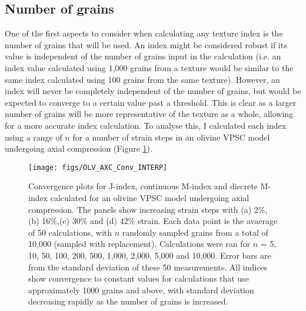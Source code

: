 \documentclass[a4paper,12pt]{report}
\numberwithin{equation}{chapter}
\begin{document}
\subsection{Number of grains}

One of the first aspects to consider when calculating any texture index is the number of grains that will be used. An index might be considered robust if its value is independent of the number of grains input in the calculation (i.e. an index value calculated using 1,000 grains from a texture would be similar to the same index calculated using 100 grains from the same texture). However, an index will never be completely independent of the number of grains, but would be expected to converge to a certain value past a threshold. This is clear as a larger number of grains will be more representative of the texture as a whole, allowing for a more accurate index calculation. To analyse this, I calculated each index using a range of $n$ for a number of strain steps in an olivine VPSC model undergoing axial compression (Figure \ref{fig:OLV_AXC_n_conv}). 

\begin{figure}[bht]
  \centering
    \texttt{[image: figs/OLV\_AXC\_Conv\_INTERP]}
  \caption[Convergence with no. grains (olivine VPSC)]{Convergence plots for J-index, continuous M-index and discrete M-index calculated for an olivine VPSC model undergoing axial compression. The panels show increasing strain steps with (a) 2\%, (b) 16\%,(c) 30\% and (d) 42\% strain. Each data point is the avaerage of 50 calculations, with $n$ randomly sampled grains from a total of 10,000 (sampled with replacement). Calculations were ran for $n$ = 5, 10, 50, 100, 200, 500, 1,000, 2,000, 5,000 and 10,000. Error bars are from the standard deviation of these 50 measurements. All indices show convergence to constant values for calculations that use approximately 1000 grains and above, with standard deviation decreasing rapidly as the number of grains is increased.}
  \label{fig:OLV_AXC_n_conv}
\end{figure}
\end{document}

